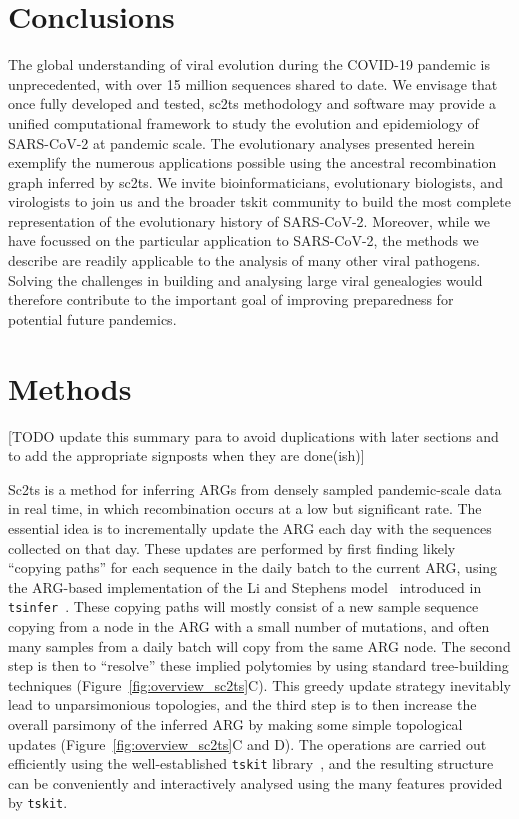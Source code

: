 \documentclass{article}
\begin{document}
\section{Conclusions}
The global understanding of viral evolution during the COVID-19 pandemic is
unprecedented, with over 15 million sequences shared to date. We envisage that
once fully developed and tested, sc2ts methodology and software may provide a
unified computational framework to study the evolution and epidemiology of
SARS-CoV-2 at pandemic scale. The evolutionary analyses presented herein
exemplify the numerous applications possible using the ancestral recombination
graph inferred by sc2ts. We invite bioinformaticians, evolutionary biologists,
and virologists to join us and the broader tskit community to build the most
complete representation of the evolutionary history of SARS-CoV-2. Moreover,
while we have focussed on the particular application to SARS-CoV-2, the methods
we describe are readily applicable to the analysis of many other viral
pathogens. Solving the challenges in building and analysing large viral
genealogies would therefore contribute to the important goal of improving
preparedness for potential future pandemics.

\section{Methods}

[TODO update this summary para to avoid duplications with
later sections and to add the appropriate signposts
when they are done(ish)]

Sc2ts is a method for inferring ARGs from densely sampled pandemic-scale data
in real time, in which recombination occurs at a low but significant rate.
The essential idea is to incrementally update the ARG each day
with the sequences collected on that day. These updates are performed by
first finding likely ``copying paths'' for each sequence in the daily
batch to the current ARG, using the ARG-based implementation of
the Li and Stephens model~\citep{Li2003-ib} introduced
in \texttt{tsinfer}~\citep{Kelleher2019-ba}.
These copying paths
will mostly consist of a new sample sequence copying from a node in the ARG
with a small number of mutations, and often many samples
from a daily batch will copy from the same ARG node. The second
step is then to ``resolve'' these implied polytomies by using
standard tree-building techniques (Figure~\ref{fig:overview_sc2ts}C).
This greedy update strategy inevitably lead to unparsimonious
topologies, and the third step is to then increase the
overall parsimony of the inferred ARG by making some simple topological
updates (Figure~\ref{fig:overview_sc2ts}C and D).
The operations are carried out efficiently using the well-established
\texttt{tskit}
library~\citep{Kelleher2018-xc,Ralph2020-efficiently,Tskit2023-tskit},
and the resulting structure can be conveniently and interactively
analysed using the many features provided by \texttt{tskit}.
\end{document}
